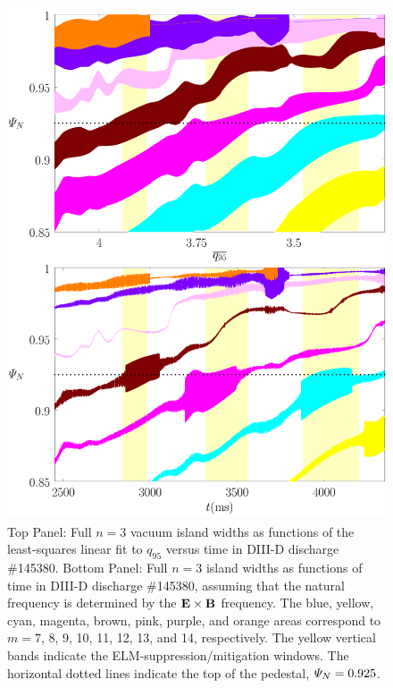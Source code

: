 \documentclass[12pt,prb,aps]{revtex4-1}
\begin{document}
\begin{figure}
\includegraphics[height=6in]{fig3.pdf}
\caption{Top Panel: Full  $n=3$ vacuum island widths as functions of the least-squares linear fit to $q_{95}$ versus time 
in   DIII-D discharge \#145380.
Bottom Panel:  Full $n=3$ island widths as functions of time
in   DIII-D discharge \#145380, assuming that the natural frequency is determined by  the ${\bf E}\times {\bf B}$
frequency. The blue, yellow, cyan, magenta, brown, pink,
purple, and orange  areas correspond to $m=7$, 8, 9, 10, 11, 12, 13, and 14, respectively. The yellow vertical bands indicate the ELM-suppression/mitigation windows. 
The horizontal dotted lines indicate the top of the pedestal, ${\mit\Psi}_N=0.925$.} \label{fig3}
\end{figure}
\end{document}
